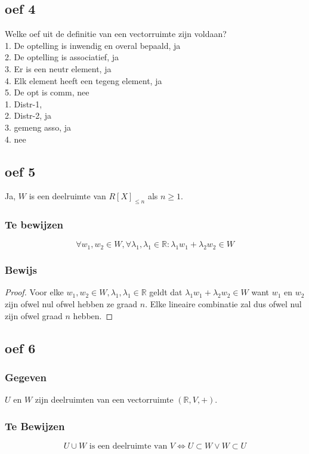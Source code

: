 \documentclass[lineaire_algebra_oplossingen.tex]{subfiles}
\begin{document}
\subsection*{oef 4}
Welke oef uit de definitie van een vectorruimte zijn voldaan? \\
1. De optelling is inwendig en overal bepaald, ja \\
2. De optelling is associatief,	ja \\
3. Er is een neutr element, ja \\
4. Elk element heeft een tegeng element, ja \\
5. De opt is comm, nee \\

1. Distr-1, \\
2. Distr-2, ja \\
3. gemeng asso, ja\\
4. nee

\subsection{oef 5}
Ja, $W$ is een deelruimte van $R[X]_{\le n}$ als $n\ge 1$.
\subsubsection*{Te bewijzen}
\[
\forall w_1,w_2 \in W,\forall \lambda_1,\lambda_1 \in \mathbb{R}: \lambda_1w_1+\lambda_2w_2 \in W
\]
\subsubsection*{Bewijs}
\begin{proof}
Voor elke $w_1,w_2 \in W, \lambda_1,\lambda_1 \in \mathbb{R}$ geldt dat $ \lambda_1w_1+\lambda_2w_2 \in W$ want $w_1$ en $w_2$ zijn ofwel nul ofwel hebben ze graad $n$. Elke lineaire combinatie zal dus ofwel nul zijn ofwel graad $n$ hebben.
\end{proof}


\subsection{oef 6}
\subsubsection*{Gegeven}
$U$ en $W$ zijn deelruimten van een vectorruimte $(\mathbb{R},V,+)$.
\subsubsection*{Te Bewijzen}
\[
U \cup W \text{ is een deelruimte van }V \Leftrightarrow U \subset W \vee W \subset U
\]
\end{document}
